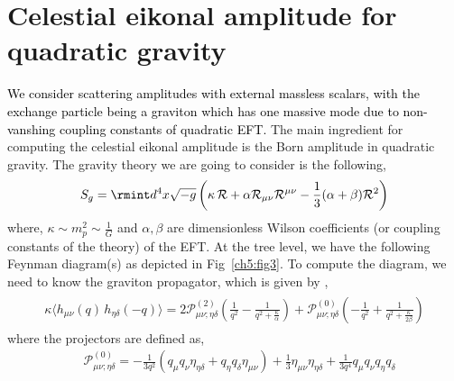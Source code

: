 \section{ Celestial eikonal amplitude for quadratic gravity}\label{ch5:sec3}
\textcolor{black}{We consider scattering amplitudes with external massless scalars, with the exchange particle being a graviton which has one massive mode due to non-vanshing coupling constants of quadratic EFT.} The main ingredient for computing the celestial eikonal amplitude is the Born amplitude in quadratic gravity. The gravity theory we are going to consider is the following,
\begin{align}
    \begin{split}
        S_{g}=\rmint d^4 x \sqrt{-g}\left(\kappa \,\mathcal{R}+\alpha \mathcal{R}_{\mu\nu}\mathcal{R}^{\mu\nu}-\frac{1}{3}(\alpha+\beta)\mathcal{R}^2\right)
    \end{split}\label{3.1i}
\end{align}
where, $\kappa\sim m_p^2\sim \frac{1}{G}$ and $\alpha,
\beta$ are dimensionless Wilson coefficients (or coupling constants of the theory) of the EFT. At the tree level, we have the following Feynman diagram(s) as depicted in Fig~\eqref{ch5:fig3}.
To compute the diagram, we need to know the graviton propagator, which is given by \cite{Hamber:2009zz},
\begin{align}
    \begin{split}\label{3.2h}
      \kappa  \langle h_{\mu\nu}(q)\,h_{\eta\delta}(-q)\rangle=2 \mathcal{P}^{(2)}_{\mu\nu;\eta\delta}\left(\frac{1}{q^2}-\frac{1}{q^2+\frac{\kappa}{\alpha}}\right)+\mathcal{P}^{(0)}_{\mu\nu;\eta\delta}\left(-\frac{1}{q^2}+\frac{1}{q^2+\frac{\kappa}{2\beta}}\right)
    \end{split}
\end{align}
where the projectors are defined as,
\begin{align}
    & \mathcal{P}^{(0)}_{\mu\nu;\eta\delta}=-\frac{1}{3q^2}\left(q_\mu q_{\nu}\eta_{\eta\delta}+q_{\eta}q_{\delta}\eta_{\mu\nu}\right)+\frac{1}{3}\eta_{\mu\nu}\eta_{\eta\delta}+\frac{1}{3q^4}q_{\mu}q_{\nu}q_{\eta}q_{\delta}
\end{align}

